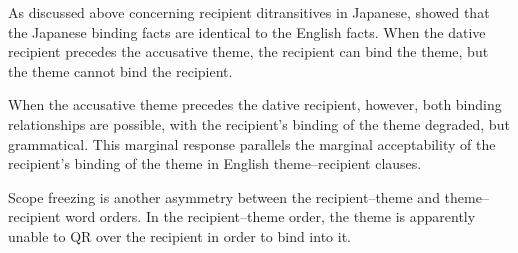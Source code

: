 \documentclass[11pt]{upenndiss}
\begin{document}
As discussed above concerning recipient ditransitives in Japanese, \cite{Takano.1998} showed that the Japanese binding facts are identical to the English facts. When the dative recipient precedes the accusative theme, the recipient can bind the theme, but the theme cannot bind the recipient.
\begin{exe}\ex \cite[ex 7]{Takano.1998}
\begin{xlist}
\end{xlist}
\end{exe}%
When the accusative theme precedes the dative recipient, however, both binding relationships are possible, with the recipient's binding of the theme degraded, but grammatical. This marginal response parallels the marginal acceptability of the recipient's binding of the theme in English theme--recipient clauses.
\begin{exe}\ex \cite[ex 7]{Takano.1998}
\begin{xlist}
\end{xlist}
\end{exe}

Scope freezing \citep{Aoun.1989,Bruening.2001,Bresnan.2007} is another asymmetry between the recipient--theme and theme--recipient word orders. In the recipient--theme order, the theme is apparently unable to QR over the recipient in order to bind into it. 
\end{document}
